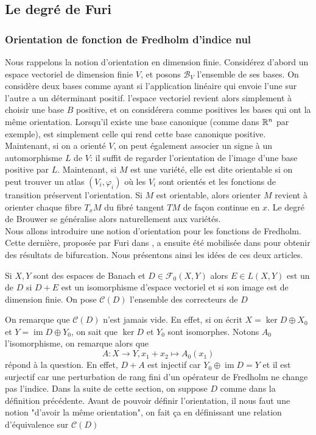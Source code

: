\documentclass[memoire.tex]{subfiles}
\begin{document}
\subsection{Le degré de Furi}
\subsubsection{Orientation de fonction de Fredholm d'indice nul}
Nous rappelons la notion d'orientation en dimension finie. Considérez 
d'abord un espace vectoriel de dimension finie $V$, et posons $\mathcal{B}
_V$ l'ensemble de ses bases. On considère deux bases comme ayant  si l'application linéaire qui envoie l'une sur l'autre a 
un déterminant positif.  l'espace vectoriel revient alors 
simplement à choisir une base $B$ positive, et on considérera comme 
positives les bases qui ont la même orientation. Lorsqu'il existe une base 
canonique (comme dans $\mathbb{R}^n$ par exemple),  
est simplement celle qui rend cette base canonique positive. Maintenant, si 
on a orienté $V$, on peut également associer un signe à un automorphisme 
$L$ de $V$: il suffit de regarder l'orientation de l'image d'une base 
positive par $L$. Maintenant, si $M$ est une variété, elle est dite 
orientable si on peut trouver un atlas $(V_i,\varphi_i)$ où les $V_i$ sont 
orientés et les fonctions de transition préservent l'orientation. Si $M$ 
est orientable, alors orienter $M$ revient à orienter chaque fibre $T_xM$ 
du fibré tangent $TM$ de façon continue en $x$. Le degré de Brouwer se 
généralise alors naturellement aux variétés.\\
Nous allons introduire une notion d'orientation pour les fonctions de Fredholm. Cette dernière, proposée par Furi dans \cite{BenevieriFuri1998}, a ensuite été mobilisée dans \cite{BenevieriFuri2001} pour obtenir des résultats de bifurcation. Nous présentons ainsi les idées de ces deux articles.
\begin{definition}
    Si $X,Y$ sont des espaces de Banach et  $D\in\mathcal{F}_0(X,Y)$ alors $E\in L(X,Y)$ est un  de $D$ si $D+E$ est un isomorphisme d'espace vectoriel et si son image est de dimension finie. On pose $\mathcal{C}(D)$ l'ensemble des correcteurs de $D$
\end{definition}
On remarque que $\mathcal{C}(D)$ n'est jamais vide. En effet, si on écrit $X=\ker D\oplus X_0$ et $Y=\operatorname*{im} D \oplus Y_0$, on sait que $\ker D$ et $Y_0$ sont isomorphes. Notons $A_0$ l'isomorphisme, on remarque alors que 
\begin{equation}\label{correcteur-exemple}
    A:  X\rightarrow Y, x_1+x_2\mapsto A_0(x_1)
\end{equation}
répond à la question. En effet, $D+A$ est injectif car $Y_0\oplus \operatorname*{im} D=Y$ et il est surjectif car une perturbation de rang fini d'un opérateur de Fredholm ne change pas l'indice.
Dans la suite de cette section, on suppose $D$ comme dans la définition précédente.
Avant de pouvoir définir l'orientation, il nous faut une notion "d'avoir la même orientation", on fait ça en définissant une relation d'équivalence sur $\mathcal{C}(D)$
\end{document}
